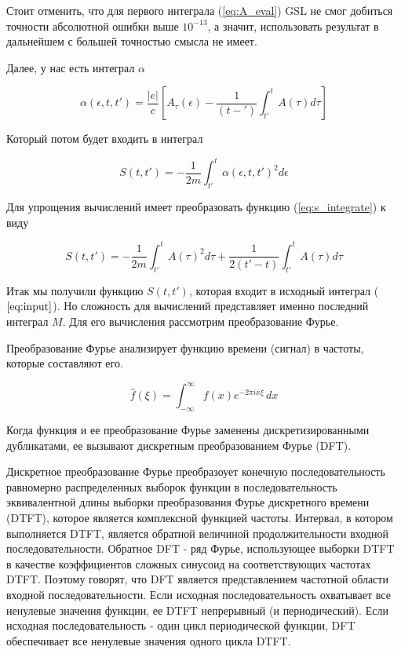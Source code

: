\documentclass[14pt]{extarticle}
\begin{document}
Стоит отменить, что для первого интеграла (\ref{eq:A_eval}) GSL не смог добиться точности абсолютной ошибки выше $10^{-13}$, а значит, использовать результат в дальнейшем с большей точностью смысла не имеет.

Далее, у нас есть интеграл $\alpha$

\begin{equation}\label{eq:alpha}
	\alpha(\epsilon, t, t') = \frac{|e|}{c} [A_{\tau}(\epsilon) - \frac{1}{(t-')}\int_{t'}^{t}A(\tau) d\tau]
\end{equation}

Который потом будет входить в интеграл 

\begin{equation}\label{eq:s_integrate}
	S(t, t') = -\frac{1}{2m}\int_{t'}^{t} \alpha(\epsilon, t, t')^2 d\epsilon
\end{equation}

Для упрощения вычислений имеет преобразовать функцию (\ref{eq:s_integrate}) к виду

\begin{equation}\label{eq:s_integrate2}
S(t, t') = -\frac{1}{2m}\int_{t'}^{t} A(\tau)^2 d\tau + \frac{1}{2(t'-t)} \int_{t'}^{t}A(\tau) d\tau
\end{equation}

Итак мы получили функцию $S(t, t')$, которая входит в исходный интеграл ($\ref{eq:input}$). Но сложность для вычислений представляет именно последний интеграл $M$. Для его вычисления рассмотрим преобразование Фурье.

Преобразование Фурье анализирует функцию времени (сигнал) в частоты, которые составляют его.

$$\hat{f}(\xi) =\int_{-\infty}^{\infty}f(x)e^{-2\pi ix\xi }\,dx$$

Когда функция и ее преобразование Фурье заменены дискретизированными дубликатами, ее вызывают дискретным преобразованием Фурье (DFT). 

Дискретное преобразование Фурье преобразоует конечную последовательность равномерно распределенных выборок функции в последовательность эквивалентной длины выборки преобразования Фурье дискретного времени (DTFT), которое является комплексной функцией частоты. Интервал, в котором выполняется DTFT, является обратной величиной продолжительности входной последовательности. Обратное DFT - ряд Фурье, использующее выборки DTFT в качестве коэффициентов сложных синусоид на соответствующих частотах DTFT. Поэтому говорят, что DFT является представлением частотной области входной последовательности. Если исходная последовательность охватывает все ненулевые значения функции, ее DTFT непрерывный (и периодический). Если исходная последовательность - один цикл периодической функции, DFT обеспечивает все ненулевые значения одного цикла DTFT.
\end{document}
